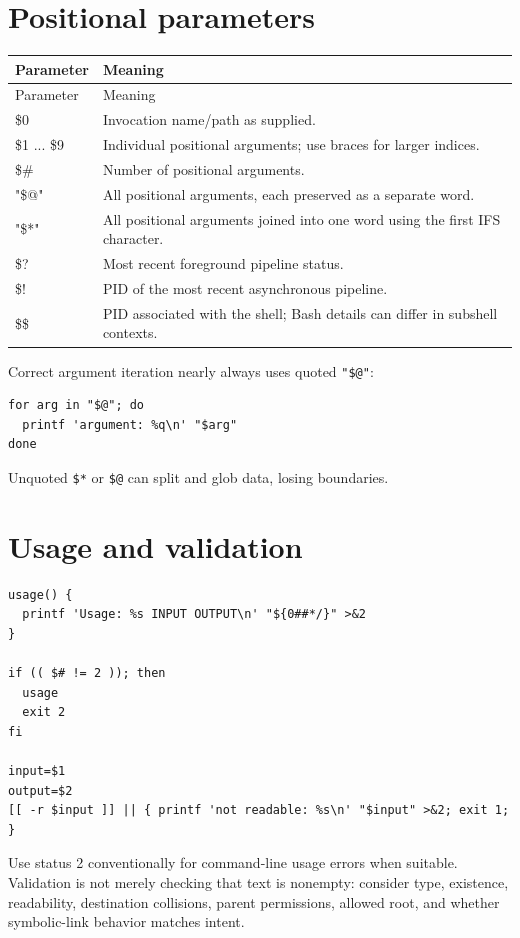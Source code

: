\documentclass[11pt,oneside,openany]{book}
\begin{document}
\section{Positional parameters}
\begin{longtable}{>{\ttfamily}p{}p{}}
\toprule
Parameter & Meaning \\
\midrule
\endfirsthead\toprule Parameter & Meaning \\
\midrule\endhead
\$0 & Invocation name/path as supplied. \\
\$1 ... \$9 & Individual positional arguments; use braces for larger indices. \\
\$\# & Number of positional arguments. \\
"\$@" & All positional arguments, each preserved as a separate word. \\
"\$*" & All positional arguments joined into one word using the first IFS character. \\
\$? & Most recent foreground pipeline status. \\
\$! & PID of the most recent asynchronous pipeline. \\
\$\$ & PID associated with the shell; Bash details can differ in subshell contexts. \\
\bottomrule
\end{longtable}

Correct argument iteration nearly always uses quoted \texttt{"\$@"}:
\begin{lstlisting}
for arg in "$@"; do
  printf 'argument: %q\n' "$arg"
done
\end{lstlisting}
Unquoted \texttt{\$*} or \texttt{\$@} can split and glob data, losing boundaries.

\section{Usage and validation}
\begin{lstlisting}
usage() {
  printf 'Usage: %s INPUT OUTPUT\n' "${0##*/}" >&2
}

if (( $# != 2 )); then
  usage
  exit 2
fi

input=$1
output=$2
[[ -r $input ]] || { printf 'not readable: %s\n' "$input" >&2; exit 1; }
\end{lstlisting}
Use status 2 conventionally for command-line usage errors when suitable. Validation is not merely checking that text is nonempty: consider type, existence, readability, destination collisions, parent permissions, allowed root, and whether symbolic-link behavior matches intent.
\end{document}
